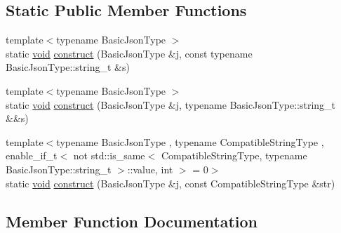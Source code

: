 \subsection*{Static Public Member Functions}
\begin{DoxyCompactItemize}
\item 
{\footnotesize template$<$typename Basic\+Json\+Type $>$ }\\static \hyperlink{namespacenlohmann_1_1detail_a59fca69799f6b9e366710cb9043aa77d}{void} \hyperlink{structnlohmann_1_1detail_1_1external__constructor_3_01value__t_1_1string_01_4_ad88d0b4b7ea01ea20e12cc1b82fe0d92}{construct} (Basic\+Json\+Type \&j, const typename Basic\+Json\+Type\+::string\+\_\+t \&s)
\item 
{\footnotesize template$<$typename Basic\+Json\+Type $>$ }\\static \hyperlink{namespacenlohmann_1_1detail_a59fca69799f6b9e366710cb9043aa77d}{void} \hyperlink{structnlohmann_1_1detail_1_1external__constructor_3_01value__t_1_1string_01_4_a74f56b9ca1d4e8db9751353d76668322}{construct} (Basic\+Json\+Type \&j, typename Basic\+Json\+Type\+::string\+\_\+t \&\&s)
\item 
{\footnotesize template$<$typename Basic\+Json\+Type , typename Compatible\+String\+Type , enable\+\_\+if\+\_\+t$<$ not std\+::is\+\_\+same$<$ Compatible\+String\+Type, typename Basic\+Json\+Type\+::string\+\_\+t $>$\+::value, int $>$  = 0$>$ }\\static \hyperlink{namespacenlohmann_1_1detail_a59fca69799f6b9e366710cb9043aa77d}{void} \hyperlink{structnlohmann_1_1detail_1_1external__constructor_3_01value__t_1_1string_01_4_a8822d43f0e20c5a28be329f9ca7de6c4}{construct} (Basic\+Json\+Type \&j, const Compatible\+String\+Type \&str)
\end{DoxyCompactItemize}


\subsection{Member Function Documentation}
